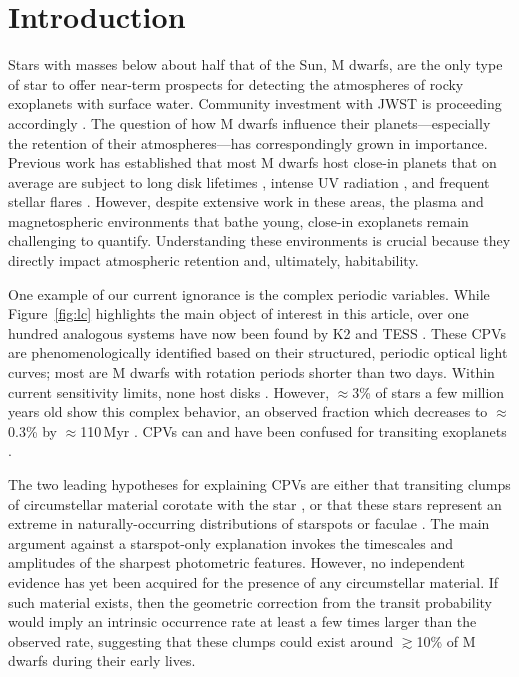 \documentclass[11pt,twocolumn,tighten]{aastex7}
\begin{document}
\section{Introduction}
\label{sec:intro}

Stars with masses below about half that of the Sun, M dwarfs, are the
only type of star to offer near-term prospects for detecting the
atmospheres of rocky exoplanets with surface water.  Community
investment with JWST is proceeding accordingly
\citep[][]{Redfield2024,TRAPPIST1JWSTCommunityInitiative2024}.  The
question of how M dwarfs influence their planets---especially the
retention of their atmospheres---has correspondingly grown in
importance.  Previous work has established that most M dwarfs host
close-in planets \citep{Dressing2015} that on average are subject to
long disk lifetimes \citep{Ribas2015}, intense UV radiation
\citep{France2016}, and frequent stellar flares \citep{Feinstein2020}.
However, despite extensive work in these areas, the plasma and
magnetospheric environments that bathe young, close-in exoplanets
remain challenging to quantify.  Understanding these environments is
crucial because they directly impact atmospheric retention and,
ultimately, habitability.

One example of our current ignorance is the complex periodic
variables.  While Figure~\ref{fig:lc} highlights the main object of
interest in this article, over one hundred analogous systems have now
been found by K2 and TESS
\citep{Rebull2016,Stauffer2017,Rebull2018,Zhan2019,Rebull2020,Stauffer2021,Popinchalk2023,Bouma2024}.
These CPVs are phenomenologically identified based on their
structured, periodic optical light curves; most are M dwarfs with
rotation periods shorter than two days.  Within current sensitivity
limits, none host disks \citep{Stauffer2017,Bouma2024}.  However,
$\approx$3\% of stars a few million years old show this complex
behavior, an observed fraction which decreases to $\approx$0.3\% by
$\approx$110\,Myr \citep{Rebull2020}.  CPVs can and have been confused
for transiting exoplanets
\citep{vanEyken2012,Johns-Krull2016,Bouma2020}.

The two leading hypotheses for explaining CPVs are either that
transiting clumps of circumstellar material corotate with the star
\citep{Stauffer2017}, or that these stars represent an extreme in
naturally-occurring distributions of starspots or faculae
\citep{Koen2021}.  The main argument against a starspot-only
explanation invokes the timescales and amplitudes of the sharpest
photometric features.  However, no independent evidence has yet been
acquired for the presence of any circumstellar material.  If such
material exists, then the geometric correction from the transit
probability would imply an intrinsic occurrence rate at least a few
times larger than the observed rate, suggesting that these clumps
could exist around $\gtrsim$10\% of M dwarfs during their early lives.
\end{document}
